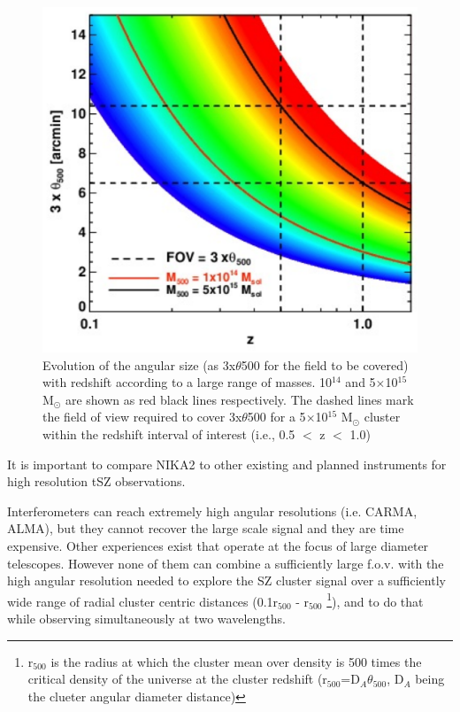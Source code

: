 \documentclass[11pt,a4paper,twoside,graphicx,color]{article}
\begin{document}
\begin{figure}
  \begin{center}
   \includegraphics[width=0.6\columnwidth]{./Figures/size_vs_z.pdf}
  \end{center}
\caption{Evolution of the angular size (as 3x$\theta$500 for the field to be covered) with redshift according to a large range of masses. 10$^{14}$ and 5$\times$10$^{15}$ M$_{\odot}$ are shown as red black lines respectively. The dashed lines mark the field of view required to cover 3x$\theta$500 for a 5$\times$10$^{15}$ M$_{\odot}$ cluster within the redshift interval of interest (i.e., 0.5 $<$ z $<$ 1.0)}
\label{Fig:size}
\end{figure}

\vspace{0.3cm}  
It is important to compare NIKA2 to other existing and planned instruments for high resolution tSZ observations. 

Interferometers can reach extremely high angular resolutions (i.e. CARMA, ALMA), but they cannot recover the large scale signal and they are time expensive. Other experiences exist that operate at the focus of large diameter telescopes. However none of them can combine a sufficiently large f.o.v. with the high angular resolution needed to explore the SZ cluster signal over a sufficiently wide range of radial cluster centric distances (0.1r$_{500}$ - r$_{500}$ \footnote{r$_{500}$ is the radius at which the cluster mean over density is 500 times the critical density of the universe at the cluster redshift (r$_{500}$=D$_{A} \theta_{500}$, D$_{A}$ being the clueter angular diameter distance)}), and to do that while observing simultaneously at two wavelengths. 
\end{document}
